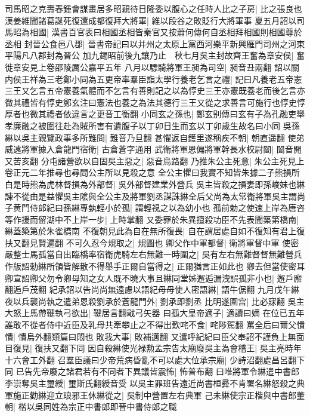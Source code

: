 司馬昭之克壽春鍾會謀畫居多昭親待日隆委以腹心之任時人比之子房|{
	比之張良也}
漢姜維聞諸葛誕死復還成都復拜大將軍|{
	維以段谷之敗貶行大將軍事}
夏五月詔以司馬昭為相國|{
	漢書百官表曰相國丞相皆秦官又按蕭何傳何自丞相拜相國則相國尊於丞相}
封晉公食邑八郡|{
	晉書帝記曰以并州之太原上黨西河樂平新興雁門司州之河東平陽凡八郡封為晉公}
加九錫昭前後九讓乃止　秋七月吳主封故齊王奮為章安侯|{
	奮徙章安見上卷邵陵厲公嘉平五年}
八月以驃騎將軍王昶為司空|{
	昶音丑兩翻}
詔以關内侯王祥為三老鄭小同為五更帝率羣臣詣太學行養老乞言之禮|{
	記曰凡養老五帝憲三王又乞言五帝憲養氣體而不乞言有善則記之以為惇史三王亦憲既養老而後乞言亦微其禮皆有惇史鄭玄注曰憲法也養之為法其德行三王又從之求善言可施行也惇史惇厚者也微其禮者依違言之更音工衡翻}
小同玄之孫也|{
	鄭玄别傳曰玄有子為孔融吏舉孝廉融之被圍往赴為賊所害有遺腹子以丁卯日生而玄以丁卯歲生故名曰小同}
吳孫綝以吳主親覽政事多所難問|{
	難音乃旦翻}
甚懼返自鑊里遂稱疾不朝|{
	朝直遥翻}
使弟威遠將軍據入倉龍門宿衛|{
	古倉蒼字通用}
武衛將軍恩偏將軍幹長水校尉闓|{
	闓音開又苦亥翻}
分屯諸營欲以自固吳主惡之|{
	惡音烏路翻}
乃推朱公主死意|{
	朱公主死見上卷正元二年推尋也尋問公主所以見殺之意}
全公主懼曰我實不知皆朱據二子熊損所白是時熊為虎林督損為外部督|{
	吳外部督建業外營兵}
吳主皆殺之損妻即孫峻妹也綝諫不從由是益懼吳主隂與全公主及將軍劉丞謀誅綝全后父尚為太常衛將軍吳主謂尚子黄門侍郎紀曰孫綝專埶輕小於孤|{
	謂輕視之以為幼小也}
孤前勅之使速上岸為唐咨等作援而留湖中不上岸一步|{
	上時掌翻}
又委罪於朱異擅殺功臣不先表聞築第橋南|{
	綝蓋築第於朱雀橋南}
不復朝見此為自在無所復畏|{
	自在謂居處自如不復知有君上復扶又翻見賢遍翻}
不可久忍今規取之|{
	規圖也}
卿父作中軍都督|{
	衛將軍督中軍}
使密嚴整士馬孤當自出臨橋率宿衛虎騎左右無難一時圍之|{
	吳有左右無難督督無難營兵}
作版詔勅綝所領皆解散不得舉手正爾自當得之|{
	正爾猶言正如此也}
卿去但當使密耳卿宣詔卿父勿令卿母知之女人既不曉大事且綝同堂姊邂逅漏洩誤孤非小也|{
	邂戶廨翻逅戶茂翻}
紀承詔以告尚尚無遠慮以語紀母母使人密語綝|{
	語牛倨翻}
九月戊午綝夜以兵襲尚執之遣弟恩殺劉承於蒼龍門外|{
	劉承即劉丞}
比明遂圍宫|{
	比必寐翻}
吳主大怒上馬帶鞬執弓欲出|{
	鞬居言翻戢弓矢器}
曰孤大皇帝適子|{
	適讀曰嫡}
在位已五年誰敢不從者侍中近臣及乳母共牽攀止之不得出歎咤不食|{
	咤陟駕翻}
罵全后曰爾父憒憒|{
	憒烏外翻類篇曰悶也}
敗我大事|{
	敗補邁翻}
又遣呼紀紀曰臣父奉詔不謹負上無面目復見|{
	復扶又翻下同}
因自殺綝使光禄勲孟宗告太廟廢吳主為會稽王|{
	吳主亮時年十六會工外翻}
召羣臣議曰少帝荒病昏亂不可以處大位承宗廟|{
	少詩沼翻處昌呂翻下同}
已告先帝廢之諸君若有不同者下異議皆震怖|{
	怖普布翻}
曰唯將軍令綝遣中書郎李崇奪吳主璽綬|{
	璽斯氏翻綬音受}
以吳主罪班告遠近尚書桓彛不肯署名綝怒殺之典軍施正勸綝迎立琅邪王休綝從之|{
	吳制中營置左右典軍}
己未綝使宗正楷與中書郎董朝|{
	楷以吳同姓為宗正中書郎即晉中書侍郎之職}
